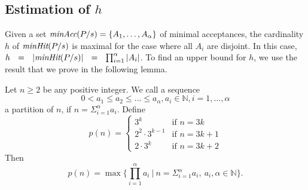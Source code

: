 \subsection{Estimation of $h$}
Given a set $\text{\it minAcc}(P/s) = \{ A_1,\dots, A_\alpha \}$ of   minimal
acceptances, the cardinality $h$ of $\text{\it minHit}(P/s)$ is maximal for the case
where all $A_i$ are disjoint. In this case,  $h~~=~~|\text{\it minHit}(P/s)|~~=~~
\prod_{i=1}^\alpha|A_i|$. To find an upper bound for $h$, we use the result
that we prove in the following lemma.
%
\begin{lemma}\label{lemma:minhitmax}
Let $n\ge 2$ be any positive integer. We call a sequence
%
$$0 < a_1\le a_2\le \ldots\le  a_{\alpha}, a_i\in \mathbb{N}, i=1,\dots, \alpha$$
%
a partition of $n$, if $n=\Sigma_{i=1}^{\alpha}a_i$. Define
%
$$p(n)=\begin{cases} 3^k &\text{if}\,\, n=3k\\ 2^2\cdot 3^{k-1} &\text{if}\,\, n=3k+1\\2\cdot 3^{k} &\text{if}\,\, n=3k+2\end{cases}$$
Then  $$p(n)=\max\big\{\prod_{i=1}^{\alpha}a_i~|~n=\Sigma_{i=1}^{\alpha}a_i,\ a_i,
\alpha\in \mathbb{N}\big\}.$$
%
\end{lemma}
